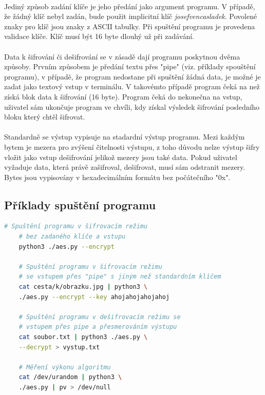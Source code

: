 \documentclass[12pt, a4paper]{article}
\begin{document}
\paragraph{}
Jediný způsob zadání klíče je jeho předání jako argument programu. V případě, že žádný klíč nebyl zadán, bude použit
implicitní klíč \textit{josefvencasladek}. Povolené znaky pro klíč jsou znaky z ASCII tabulky. Při spuštění programu
je provedena validace klíče. Klíč musí být 16 byte dlouhý už při zadávání.

\paragraph{}
Data k šifrování či dešifrování se v zásadě dají programu poskytnou dvěma způsoby. Prvním způsobem je předání textu přes
"pipe" (viz. příklady spouštění programu), v případě, že program nedostane při spuštění žádná data, je možné je zadat
jako textový vstup v terminálu. V takovémto případě program čeká na než získá blok data k šifrování (16 byte).
Program čeká do nekonečna na vstup, uživatel sám ukončuje program ve chvíli, kdy získal výsledek šifrování posledního
bloku který chtěl šifrovat.

\paragraph{}
Standardně se výstup vypisuje na stadardní výstup programu. Mezi každým bytem je mezera pro zvýšení čitelnosti výstupu,
z toho důvodu nelze výstup šifry vložit jako vstup dešifrování jelikož mezery jsou také data. Pokud uživatel vyžaduje data,
která právě zašifroval, dešifrovat, musí sám odstranit mezery. Bytes jsou vypisovány v hexadecimálním formátu bez počátečního
"0x".

\newpage
\subsection{Příklady spuštění  programu}
\begin{lstlisting}[language=bash]
    # Spuštění programu v šifrovacím režimu
    # bez zadaného klíče a vstupu
    python3 ./aes.py --encrypt

    # Spuštění programu v šifrovacím režimu
    # se vstupem přes "pipe" s jiným než standardním klíčem
    cat cesta/k/obrazku.jpg | python3 \
    ./aes.py --encrypt --key ahojahojahojahoj

    # Spuštění programu v dešifrovacím režimu se
    # vstupem přes pipe a přesmerováním výstupu
    cat soubor.txt | python3 ./aes.py \
    --decrypt > vystup.txt

    # Měření výkonu algoritmu
    cat /dev/urandom | python3 \
    ./aes.py | pv > /dev/null
\end{lstlisting}
\end{document}
